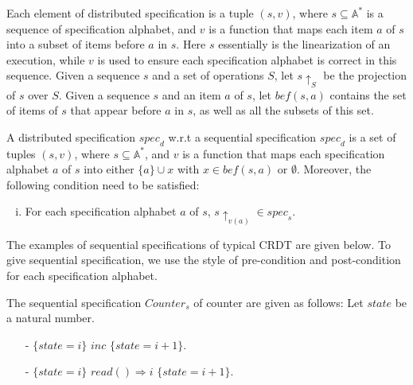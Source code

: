  Each element of distributed specification is a tuple $(s,v)$, where $s \subseteq \mathbb{A}^*$ is a sequence of specification alphabet, and $v$ is a function that maps each item $a$ of $s$ into a subset of items before $a$ in $s$. Here $s$ essentially is the linearization of an execution, while $v$ is used to ensure each specification alphabet is correct in this sequence. %
Given a sequence $s$ and a set of operations $S$, let $s \uparrow_{S}$ be the projection of $s$ over $S$. Given a sequence $s$ and an item $a$ of $s$, let $\mathit{bef}(s,a)$ contains the set of items of $s$ that appear before $a$ in $s$, as well as all the subsets of this set. 

\begin{definition}
\label{definition:distributed specification}
A distributed specification $\mathit{spec}_d$ w.r.t a sequential specification $\mathit{spec}_d$ is a set of tuples $(s,v)$, where $s \subseteq \mathbb{A}^*$, and %
$v$ is a function that maps each specification alphabet $a$ of $s$ into either $\{ a \} \cup x$ with $ x \in \mathit{bef}(s,a)$ or $\emptyset$. Moreover, the following condition need to be satisfied:

\begin{enumerate}[(i)]
\item For each specification alphabet $a$ of $s$, $s \uparrow_{v(a)} \in \mathit{spec}_s$. 
\end{enumerate} 
\end{definition} 

The examples of sequential specifications of typical CRDT are given below. To give sequential specification, we use the style of pre-condition and post-condition for each specification alphabet.


\begin{example}[Counter]
\label{definition:sequential specification of counter}
The sequential specification $\mathit{Counter}_s$ of counter are given as follows: Let $state$ be a natural number. 

\begin{itemize}
\setlength{\itemsep}{0.5pt}
\item[-] $\{ state = i \}$ $inc$ $\{ state = i+1 \}$.
\item[-] $\{ state = i \}$ $read() \Rightarrow i$ $\{ state = i+1 \}$.
\end{itemize} 
\end{example} 


